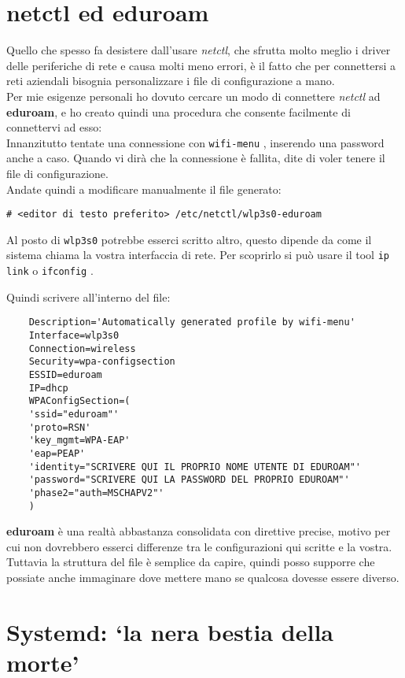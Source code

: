 \documentclass[twoside,italian]{book}
\newcommand{\centcode}[1]{
	
	\definecolor{centcode}{rgb}{0.5,0.1,0.1}
	
	\begin{center}
	 	\texttt{\textcolor{centcode}{#1}}
	\end{center}
	
	
}
\newcommand{\code}[1]{
	\texttt{\textcolor{code}{#1}}
}
\begin{document}
		\section{netctl ed eduroam}
			Quello che spesso fa desistere dall'usare \textit{netctl}, che sfrutta molto meglio i driver delle periferiche di rete e causa molti meno errori, è il fatto che per connettersi a reti aziendali bisognia personalizzare i file di configurazione a mano. \\
			Per mie esigenze personali ho dovuto cercare un modo di connettere \textit{netctl} ad \textbf{eduroam}, e ho creato quindi una procedura che consente facilmente di connettervi ad esso:\\
			Innanzitutto tentate una connessione con \code{wifi-menu}, inserendo una password anche a caso. Quando vi dirà che la connessione è fallita, dite di voler tenere il file di configurazione.\\
			Andate quindi a modificare manualmente il file generato:\centcode{\# <editor di testo preferito> /etc/netctl/wlp3s0-eduroam}
			
			\begin{tcolorbox}[floatplacement=b,width=\textwidth,colback={blue},title={NOTA BENE:},colbacktitle=gray,coltitle=white,colupper=white]
				Al posto di \code{wlp3s0} potrebbe esserci scritto altro, questo dipende da come il sistema chiama la vostra interfaccia di rete. Per scoprirlo si può usare il tool \code{ip link} o \code{ifconfig}.
			\end{tcolorbox}
			
			Quindi scrivere all'interno del file:
\begin{lstlisting}
	Description='Automatically generated profile by wifi-menu'
	Interface=wlp3s0
	Connection=wireless
	Security=wpa-configsection
	ESSID=eduroam
	IP=dhcp
	WPAConfigSection=(
	'ssid="eduroam"'
	'proto=RSN'
	'key_mgmt=WPA-EAP'
	'eap=PEAP'
	'identity="SCRIVERE QUI IL PROPRIO NOME UTENTE DI EDUROAM"'
	'password="SCRIVERE QUI LA PASSWORD DEL PROPRIO EDUROAM"'
	'phase2="auth=MSCHAPV2"'
	)
\end{lstlisting}
			
			\textbf{eduroam} è una realtà abbastanza consolidata con direttive precise, motivo per cui non dovrebbero esserci differenze tra le configurazioni qui scritte e la vostra. Tuttavia la struttura del file è semplice da capire, quindi posso supporre che possiate anche immaginare dove mettere mano se qualcosa dovesse essere diverso.
			
		
		\section{Systemd: `la nera bestia della morte'}
			
\end{document}
